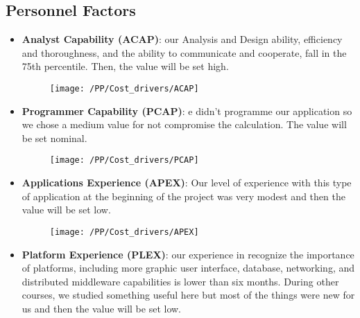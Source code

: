 \subsection{Personnel Factors}
\begin{itemize}
    \item \textbf{Analyst Capability (ACAP)}: our Analysis and Design ability, efficiency and thoroughness, and the ability to communicate and cooperate, fall in the 75th percentile. Then, the value will be set high.
    \begin{figure}[!ht]
      \centering
      \vspace{0.2cm}
      \texttt{[image: /PP/Cost\_drivers/ACAP]}\\
      \vspace{0.2cm}
      \label{fig:ACAP} 
    \end{figure}   
    \item \textbf{Programmer Capability (PCAP)}: e didn't programme our application so we chose a medium value for not compromise the calculation. The value will be set nominal.
    \begin{figure}[!ht]
      \centering
      \vspace{0.2cm}
      \texttt{[image: /PP/Cost\_drivers/PCAP]}\\
      \vspace{0.2cm}
      \label{fig:PCAP} 
    \end{figure}   
    \item \textbf{Applications Experience (APEX)}:  Our level of experience with this type of application at the beginning of the project was very modest and then the value will be set low.
    \begin{figure}[!ht]
      \centering
      \vspace{0.2cm}
      \texttt{[image: /PP/Cost\_drivers/APEX]}\\
      \vspace{0.2cm}
      \label{fig:APEX} 
    \end{figure}   
    \item \textbf{Platform Experience (PLEX)}: our experience in recognize the importance of platforms, including more graphic user interface, database, networking, and distributed middleware capabilities is lower than six months. During other courses, we studied something useful here but most of the things were new for us and then the value will be set low.

\end{itemize}
